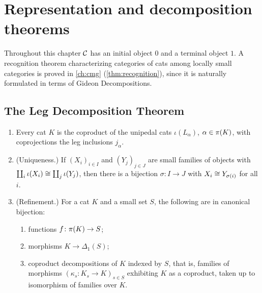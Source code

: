 \chapter{Representation and decomposition theorems}\label{ch:representation}

\begin{assumption}\label{ass:ch12}
Throughout this chapter $\mathcal{C}$ has an initial object $0$ and a terminal object
$1$. A recognition theorem characterizing categories of cats among locally
small categories is proved in \cref{ch:cmg} (\cref{thm:recognition}), since it is
naturally formulated in terms of Gideon Decompositions.
\end{assumption}

\section{The Leg Decomposition Theorem}\label{sec:leg-decomposition}

\begin{theorem}\label{thm:leg-decomposition}
\begin{enumerate}
\item Every cat $K$ is the coproduct of the unipedal cats $\iota(L_\alpha)$,
  $\alpha\in\pi(K)$, with coprojections the leg inclusions $j_\alpha$.
\item \textup{(Uniqueness.)} If $(X_i)_{i\in I}$ and $(Y_j)_{j\in J}$ are small
  families of objects with $\coprod_i\iota(X_i)\cong\coprod_j\iota(Y_j)$, then there
  is a bijection $\sigma\colon I\to J$ with $X_i\cong Y_{\sigma(i)}$ for all $i$.
\item \textup{(Refinement.)} For a cat $K$ and a small set $S$, the following
  are in canonical bijection:
  \begin{enumerate}
  \item functions $f\colon\pi(K)\to S$;
  \item morphisms $K\to\Delta_1(S)$;
  \item coproduct decompositions of $K$ indexed by $S$, that is, families of
    morphisms $(\kappa_s\colon K_s\to K)_{s\in S}$ exhibiting $K$ as a coproduct,
    taken up to isomorphism of families over $K$.
  \end{enumerate}
\end{enumerate}
\end{theorem}

